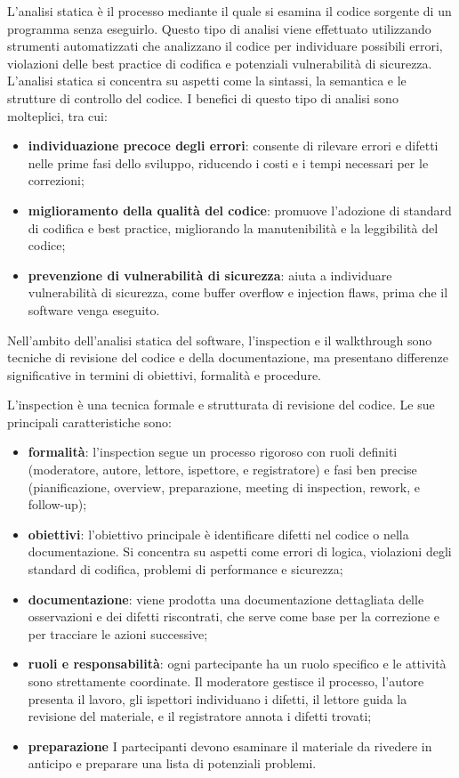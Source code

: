 L'analisi statica è il processo mediante il quale si esamina il codice sorgente di un programma senza eseguirlo. Questo tipo di analisi viene effettuato utilizzando strumenti automatizzati che analizzano il codice per individuare possibili errori, violazioni delle best practice di codifica e potenziali vulnerabilità di sicurezza. L'analisi statica si concentra su aspetti come la sintassi, la semantica e le strutture di controllo del codice. I benefici di questo tipo di analisi sono molteplici, tra cui:
\begin{itemize}
	\item \textbf{individuazione precoce degli errori}: consente di rilevare errori e difetti nelle prime fasi dello sviluppo, riducendo i costi e i tempi necessari per le correzioni;
	\item \textbf{miglioramento della qualità del codice}: promuove l'adozione di standard di codifica e best practice, migliorando la manutenibilità e la leggibilità del codice;
	\item \textbf{prevenzione di vulnerabilità di sicurezza}: aiuta a individuare vulnerabilità di sicurezza, come buffer overflow e injection flaws, prima che il software venga eseguito.
\end{itemize}

Nell'ambito dell'analisi statica del software, l'inspection e il walkthrough sono tecniche di revisione del codice e della documentazione, ma presentano differenze significative in termini di obiettivi, formalità e procedure.

L'inspection è una tecnica formale e strutturata di revisione del codice. Le sue principali caratteristiche sono:
\begin{itemize}
	\item \textbf{formalità}: l'inspection segue un processo rigoroso con ruoli definiti (moderatore, autore, lettore, ispettore, e registratore) e fasi ben precise (pianificazione, overview, preparazione, meeting di inspection, rework, e follow-up);
	\item \textbf{obiettivi}: l'obiettivo principale è identificare difetti nel codice o nella documentazione. Si concentra su aspetti come errori di logica, violazioni degli standard di codifica, problemi di performance e sicurezza;
	\item \textbf{documentazione}: viene prodotta una documentazione dettagliata delle osservazioni e dei difetti riscontrati, che serve come base per la correzione e per tracciare le azioni successive;
	\item \textbf{ruoli e responsabilità}: ogni partecipante ha un ruolo specifico e le attività sono strettamente coordinate. Il moderatore gestisce il processo, l'autore presenta il lavoro, gli ispettori individuano i difetti, il lettore guida la revisione del materiale, e il registratore annota i difetti trovati;
	\item \textbf{preparazione} I partecipanti devono esaminare il materiale da rivedere in anticipo e preparare una lista di potenziali problemi.
\end{itemize}

